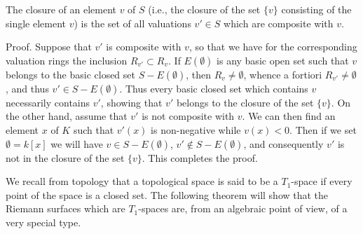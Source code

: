 The closure of an element $v$ of $S$ (i.e., the closure of the set $\{v\}$ consisting of the single element $v$) is the set of all valuations $v' \in S$ which are composite with $v$.

Proof. Suppose that $v'$ is composite with $v$, so that we have for the corresponding valuation rings the inclusion $R_{v'} \subset R_v$. If $E(\emptyset)$ is any basic open set such that $v$ belongs to the basic closed set $S - E(\emptyset)$, then $R_v \neq \emptyset$, whence a fortiori $R_{v'} \neq \emptyset$, and thus $v' \in S - E(\emptyset)$. Thus every basic closed set which contains $v$ necessarily contains $v'$, showing that $v'$ belongs to the closure of the set $\{v\}$. On the other hand, assume that $v'$ is not composite with $v$. We can then find an element $x$ of $K$ such that $v'(x)$ is non-negative while $v(x) < 0$. Then if we set $\emptyset = k[x]$ we will have $v \in S - E(\emptyset)$, $v' \notin S - E(\emptyset)$, and consequently $v'$ is not in the closure of the set $\{v\}$. This completes the proof.

We recall from topology that a topological space is said to be a $T_1$-space if every point of the space is a closed set. The following theorem will show that the Riemann surfaces which are $T_1$-spaces are, from an algebraic point of view, of a very special type.